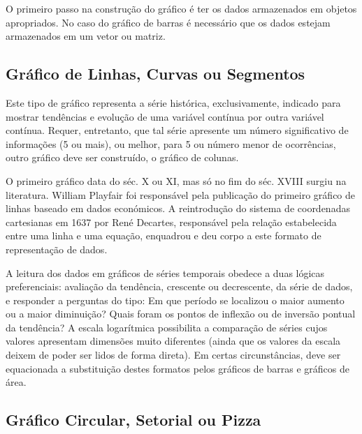 \inic O primeiro passo na construção do gráfico é ter os dados armazenados em objetos apropriados. No caso do gráfico de barras é necessário que os dados estejam armazenados em um vetor ou matriz.







\subsection{Gráfico de Linhas, Curvas ou Segmentos}

Este tipo de gráfico representa a série histórica, exclusivamente,
indicado para mostrar tendências e evolução de uma variável
contínua por outra variável contínua. Requer, entretanto, que tal
série apresente um número significativo de informações (5 ou
mais), ou melhor, para 5 ou número menor de ocorrências, outro
gráfico deve ser construído, o gráfico de colunas.\vskip0.3cm

O primeiro gráfico data do séc. X ou XI, mas só no fim do séc. XVIII surgiu na literatura. William Playfair foi responsável pela publicação do primeiro gráfico de linhas baseado em dados económicos. A reintrodução do sistema de coordenadas cartesianas em 1637 por René Decartes, responsável pela relação estabelecida entre uma linha e uma equação, enquadrou e deu corpo a este formato de representação de dados.\vskip0.3cm

A leitura dos dados em gráficos de séries temporais obedece a duas lógicas preferenciais: avaliação da tendência, crescente ou decrescente, da série de dados, e responder a perguntas do tipo: Em que período se localizou o maior aumento ou a maior diminuição? Quais foram os pontos de inflexão ou de inversão pontual da tendência? A escala logarítmica possibilita a comparação de séries cujos valores apresentam dimensões muito diferentes (ainda que os valores da escala deixem de poder ser lidos de forma direta). Em certas circunstâncias, deve ser equacionada a substituição destes formatos pelos gráficos de barras e gráficos de área.

\newpage
\subsection{Gráfico Circular, Setorial ou Pizza}

